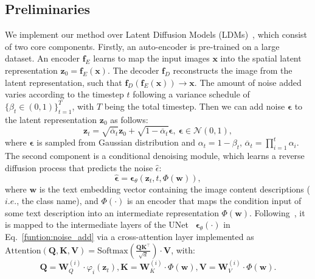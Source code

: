 \subsection{Preliminaries} 
We implement our method over Latent Diffusion Models (LDMs)~\cite{rombach2022high}, 
which consist of two core components. Firstly, an auto-encoder is pre-trained on a large dataset. An encoder $\mathbf{f}_E$ learns to map the input images $\mathbf{x}$ into the spatial latent representation $\mathbf{z}_0=\mathbf{f}_E(\mathbf{x})$. The decoder $\mathbf{f}_D$ reconstructs the image from the latent representation, such that $\mathbf{f}_D(\mathbf{f}_E(\mathbf{x}))\xrightarrow{} \mathbf{x}$. The amount of noise added varies according to the timestep $t$ following a variance schedule of $\{\beta_t \in (0,1)\}_{t=1}^{T}$, with $T$ being the total timestep. Then we can add noise $\mathbf{\epsilon}$ to the latent representation $\mathbf{z}_0$ as follows:
\begin{equation}
    \mathbf{z}_{t}=\sqrt{\overline{\alpha}_{t}}\mathbf{z}_{0} + \sqrt{1-\overline{\alpha}_{t}}\mathbf{\epsilon}, \ 
    \mathbf{\epsilon} \in \mathcal{N}\left(0,1\right),
    \label{function:add_noise}
\end{equation} 
where $\mathbf{\epsilon}$ is sampled from Gaussian distribution and $\alpha_t=1-\beta_t$, $\overline{\alpha}_t=\prod_{i=1}^{t}\alpha_i$. 
The second component is a conditional denoising module, which learns a reverse diffusion process that predicts the noise $\hat{\epsilon}$:
\begin{equation}
    \hat{\mathbf{\epsilon}}=\mathbf{\epsilon}_{\theta}(\mathbf{z}_t,t,\Phi(\mathbf{w})),
    \label{funtion:noise_add}
\end{equation}
where $\mathbf{w}$ is the text embedding vector containing the image content descriptions ($i.e.$, the class name), and $\Phi(\cdot)$ is an encoder that maps the condition input of some text description into an intermediate representation $\Phi(\mathbf{w})$. 
Following~\cite{rombach2022high}, it is mapped to the intermediate layers of the UNet~\cite{ronneberger2015u} $\mathbf{\epsilon}_{\theta}(\cdot)$ in Eq.~\textcolor{red}{\ref{funtion:noise_add}} via a cross-attention layer implemented as $\mathrm{Attention}(\mathbf{Q},\mathbf{K},\mathbf{V})=\mathrm{Softmax}(\frac{\mathbf{Q}\mathbf{K}^{\top}}{\sqrt{d}})\cdot \mathbf{V}$, with:
\begin{equation}
    \mathbf{Q}=\mathbf{W}_Q^{(i)} \cdot \varphi_i(\mathbf{z}_t), \mathbf{K}=\mathbf{W}_K^{(i)} \cdot \Phi(\mathbf{w}), \mathbf{V}=\mathbf{W}_V^{(i)} \cdot \Phi(\mathbf{w}).
    \label{function:UNet_crossattention}
\end{equation}
